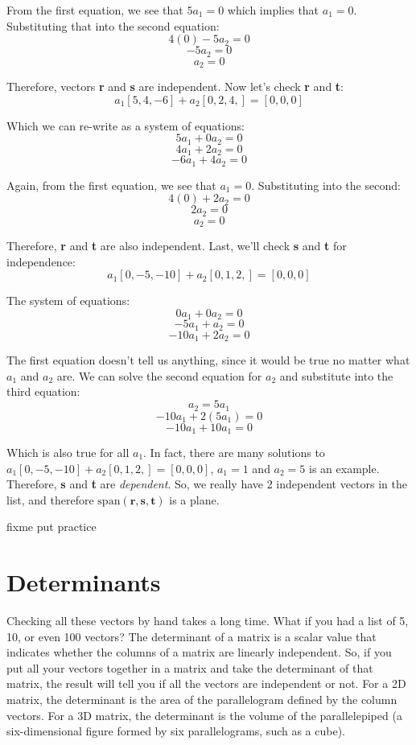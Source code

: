 From the first equation, we see that $5a_1 = 0$ which implies that $a_1 = 0$. 
Substituting that into the second equation:
$$4(0) - 5a_2 = 0$$
$$-5a_2 = 0$$
$$a_2 = 0$$

Therefore, vectors \textbf{r} and \textbf{s} are independent. Now let's check 
\textbf{r} and \textbf{t}:
$$a_1 \left[5, 4, -6 \right] + a_2 \left[ 0, 2, 4, \right] = \left[ 0, 0, 0 
\right]$$

Which we can re-write as a system of equations:
$$5a_1 + 0a_2 = 0$$
$$4a_1 + 2a_2 = 0$$
$$-6a_1 + 4a_2 = 0$$

Again, from the first equation, we see that $a_1 = 0$. Substituting into the 
second:
$$4(0) + 2a_2 = 0$$
$$2a_2 = 0$$
$$a_2 = 0$$

Therefore, \textbf{r} and \textbf{t} are also independent. Last, we'll check 
\textbf{s} and \textbf{t} for independence:
$$a_1 \left[0, -5, -10 \right] + a_2 \left[ 0, 1, 2, \right] = \left[ 0, 0, 0 
\right]$$

The system of equations:
$$0a_1 + 0a_2 = 0$$
$$-5a_1 + a_2 = 0$$
$$-10a_1 + 2a_2 = 0$$

The first equation doesn't tell us anything, since it would be true no matter 
what $a_1$ and $a_2$ are. We can solve the second equation for $a_2$ and 
substitute into the third equation:
$$a_2 = 5a_1$$
$$-10a_1 + 2 \left(5a_1 \right) = 0$$
$$-10a_1 + 10a_1 = 0$$

Which is also true for all $a_1$. In fact, there are many solutions to $a_1 
\left[0, -5, -10 \right] + a_2 \left[ 0, 1, 2, \right] = \left[ 0, 0, 0 
\right]$, $a_1 = 1$ and $a_2 = 5$ is an example. Therefore, \textbf{s} and 
\textbf{t} are \textit{dependent}. So, we really have 2 independent vectors in 
the list, and therefore $\text{span}(\mathbf{r}, \mathbf{s}, \mathbf{t})$ is a 
plane. 

\begin{Exercise}[title = {Determining Span}, label = span1]
fixme put practice
\end{Exercise}

\begin{Answer}[ref = span1]

\end{Answer}
\section{Determinants}
Checking all these vectors by hand takes a long time. What if you had a list 
of 5, 10, or even 100 vectors? The determinant of a matrix is a scalar value 
that indicates whether the columns of a matrix are linearly independent. So, 
if you put all your vectors together in a matrix and take the determinant of 
that matrix, the result will tell you if all the vectors are independent or 
not. For a 2D matrix, the determinant is the area of the parallelogram defined 
by the column vectors. For a 3D matrix, the determinant is the volume of the 
parallelepiped (a six-dimensional figure formed by six parallelograms, such as 
a cube). 

